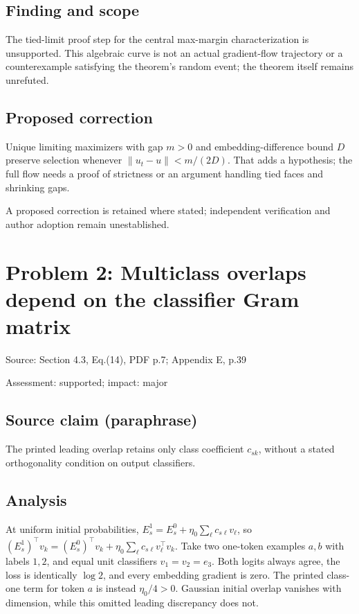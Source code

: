 \documentclass[11pt]{article}
\begin{document}
\subsection*{Finding and scope}

The tied-limit proof step for the central max-margin characterization is unsupported. This algebraic curve is not an actual gradient-flow trajectory or a counterexample satisfying the theorem’s random event; the theorem itself remains unrefuted.

\subsection*{Proposed correction}

Unique limiting maximizers with gap \(m>0\) and embedding-difference bound \(D\) preserve selection whenever \(\|u_t-u\|<m/(2D)\). That adds a hypothesis; the full flow needs a proof of strictness or an argument handling tied faces and shrinking gaps.

A proposed correction is retained where stated; independent verification and author adoption remain unestablished.

\section*{Problem 2: Multiclass overlaps depend on the classifier Gram matrix}

Source: Section 4.3, Eq.(14), PDF p.7; Appendix E, p.39

Assessment: supported; impact: major

\subsection*{Source claim (paraphrase)}

The printed leading overlap retains only class coefficient \(c_{sk}\), without a stated orthogonality condition on output classifiers.

\subsection*{Analysis}

At uniform initial probabilities, \(E_s^1=E_s^0+\eta_0\sum_\ell c_{s\ell}v_\ell\), so \((E_s^1)^\top v_k=(E_s^0)^\top v_k+\eta_0\sum_\ell c_{s\ell}v_\ell^\top v_k\). Take two one-token examples \(a,b\) with labels \(1,2\), and equal unit classifiers \(v_1=v_2=e_3\). Both logits always agree, the loss is identically \(\log2\), and every embedding gradient is zero. The printed class-one term for token \(a\) is instead \(\eta_0/4>0\). Gaussian initial overlap vanishes with dimension, while this omitted leading discrepancy does not.
\end{document}
